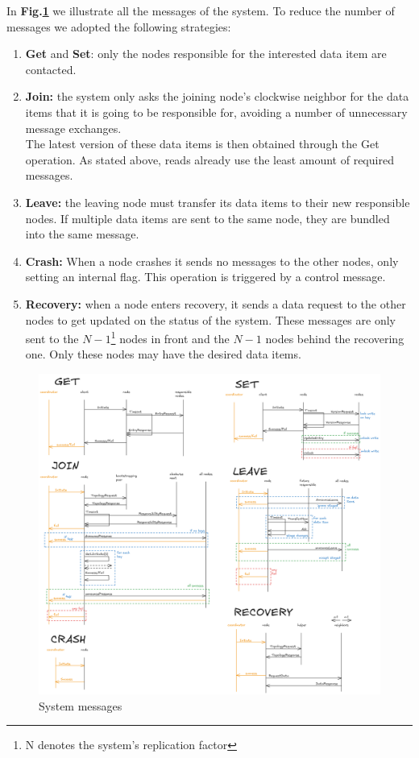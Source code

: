 \documentclass{article}
\begin{document}
In \textbf{Fig.\ref{fig:messages}} we illustrate all the messages of the 
system. To reduce the number of messages we adopted the following strategies:
\begin{enumerate}
    \item \textbf{Get} and \textbf{Set}: only the nodes responsible for the 
    interested data item are contacted.
    \item \textbf{Join:} the system only asks the joining node's clockwise 
    neighbor for the data items that it is going to be responsible for, 
    avoiding a number of unnecessary message exchanges.\\
        The latest version of these data items is then obtained through the 
        Get operation. As stated above, reads already use the least 
        amount of required messages.
    \item \textbf{Leave:} the leaving node must transfer its data items to their 
    new responsible nodes. If multiple data items are sent to the same node, 
    they are bundled into the same message.
    \item \textbf{Crash:} When a node crashes it sends no messages to the 
    other nodes, only setting an internal flag. This operation is triggered 
    by a control message.
    \item \textbf{Recovery:} when a node enters recovery, it sends a data 
    request to the other nodes to get updated on the status of the system. 
    These messages are only sent to the $N-1$\footnote{N denotes the system's 
    replication factor} nodes in front and the $N-1$ nodes behind the recovering 
    one. Only these nodes may have the desired data items.
\end{enumerate}

\begin{figure}[ht!]
    \centering
    \includegraphics[width=1\linewidth]{images/messages.png}
    \caption{System messages}
    \label{fig:messages}
\end{figure}
\end{document}

